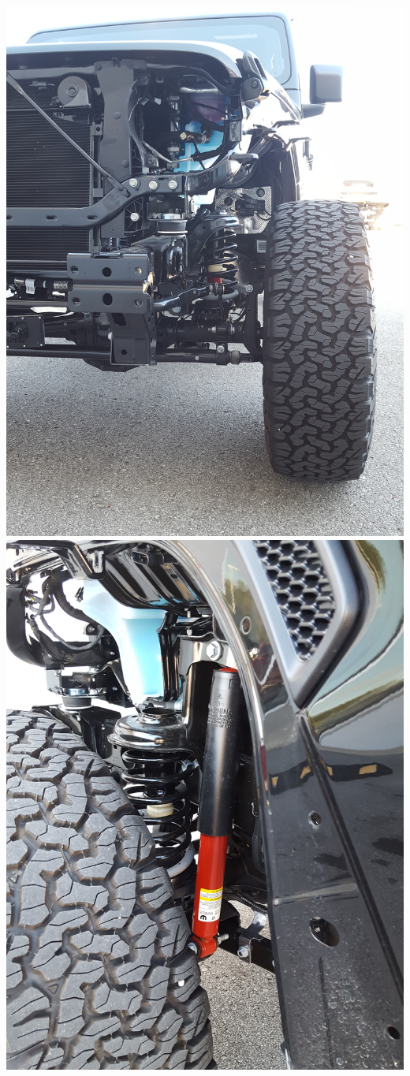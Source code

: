 \documentclass[11pt]{article}
\begin{document}
\begin{itemize}
\includegraphics[scale=.1,angle=-90,origin=c]{jeep_01.jpg} \includegraphics[scale=.1,angle=-90,origin=c]{jeep_02.jpg} \\

\end{itemize}
\end{document}
